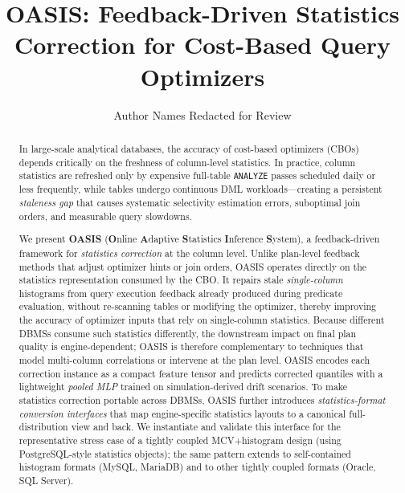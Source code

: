 \documentclass[runningheads]{llncs}
\begin{document}
\title{OASIS: Feedback-Driven Statistics Correction for Cost-Based Query Optimizers}


\author{Author Names Redacted for Review}



\maketitle

\begin{abstract}
In large-scale analytical databases, the accuracy of cost-based optimizers
(CBOs) depends critically on the freshness of column-level statistics.
In practice, column statistics are refreshed only by expensive full-table
\texttt{ANALYZE} passes scheduled daily or less frequently,
while tables undergo continuous DML workloads---creating a persistent
\emph{staleness gap} that causes systematic selectivity estimation errors,
suboptimal join orders, and measurable query slowdowns.

We present \textbf{OASIS} (\textbf{O}nline \textbf{A}daptive \textbf{S}tatistics
\textbf{I}nference \textbf{S}ystem), a feedback-driven framework for
\emph{statistics correction} at the column level.
Unlike plan-level feedback methods that adjust optimizer hints or join orders,
OASIS operates directly on the statistics representation consumed by the CBO. It
repairs stale \emph{single-column} histograms from query execution feedback
already produced during predicate evaluation, without re-scanning tables or
modifying the optimizer, thereby improving the accuracy of optimizer inputs that
rely on single-column statistics. Because different DBMSs consume such
statistics differently, the downstream impact on final plan quality is
engine-dependent; OASIS is therefore complementary to techniques that model
multi-column correlations or intervene at the plan level. OASIS encodes each
correction instance as a compact feature tensor and predicts corrected quantiles
with a lightweight \emph{pooled MLP} trained on simulation-derived
drift scenarios. To make statistics correction portable across DBMSs, OASIS
further introduces \emph{statistics-format conversion interfaces} that map
engine-specific statistics layouts to a canonical full-distribution view and
back. We instantiate and validate this interface for the
representative stress case of a tightly coupled MCV+histogram design (using
PostgreSQL-style statistics objects); the same pattern extends to self-contained
histogram formats (MySQL, MariaDB) and to other tightly coupled formats
(Oracle, SQL Server).


\end{abstract}
\end{document}
